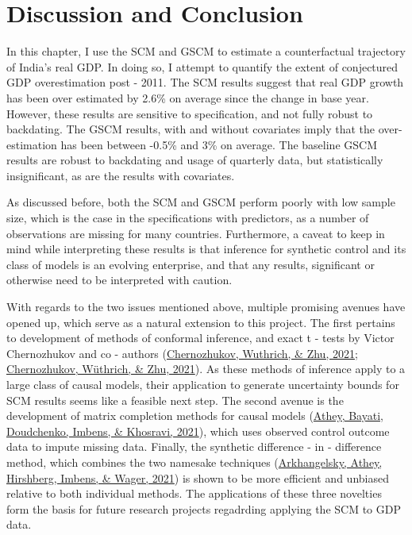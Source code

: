 \documentclass[12pt,nobind, a4paper]{reedthesis}
\begin{document}
 \hypertarget{discussion-and-conclusion}{%
 \section{Discussion and Conclusion}\label{discussion-and-conclusion}}

 In this chapter, I use the SCM and GSCM to estimate a counterfactual trajectory of India's real GDP. In doing so, I attempt to quantify the extent of conjectured GDP overestimation post - 2011. The SCM results suggest that real GDP growth has been over estimated by 2.6\% on average since the change in base year. However, these results are sensitive to specification, and not fully robust to backdating. The GSCM results, with and without covariates imply that the over-estimation has been between -0.5\% and 3\% on average. The baseline GSCM results are robust to backdating and usage of quarterly data, but statistically insignificant, as are the results with covariates.
 \linebreak

 As discussed before, both the SCM and GSCM perform poorly with low sample size, which is the case in the specifications with predictors, as a number of observations are missing for many countries. Furthermore, a caveat to keep in mind while interpreting these results is that inference for synthetic control and its class of models is an evolving enterprise, and that any results, significant or otherwise need to be interpreted with caution.
 \linebreak

 With regards to the two issues mentioned above, multiple promising avenues have opened up, which serve as a natural extension to this project. The first pertains to development of methods of conformal inference, and exact t - tests by Victor Chernozhukov and co - authors (\protect\hyperlink{ref-chernozhukov_t-test_2021}{Chernozhukov, Wuthrich, \& Zhu, 2021}; \protect\hyperlink{ref-chernozhukov_exact_2021}{Chernozhukov, Wüthrich, \& Zhu, 2021}). As these methods of inference apply to a large class of causal models, their application to generate uncertainty bounds for SCM results seems like a feasible next step. The second avenue is the development of matrix completion methods for causal models (\protect\hyperlink{ref-athey_matrix_2021}{Athey, Bayati, Doudchenko, Imbens, \& Khosravi, 2021}), which uses observed control outcome data to impute missing data. Finally, the synthetic difference - in - difference method, which combines the two namesake techniques (\protect\hyperlink{ref-arkhangelsky_synthetic_2021}{Arkhangelsky, Athey, Hirshberg, Imbens, \& Wager, 2021}) is shown to be more efficient and unbiased relative to both individual methods. The applications of these three novelties form the basis for future research projects regadrding applying the SCM to GDP data.
\end{document}
